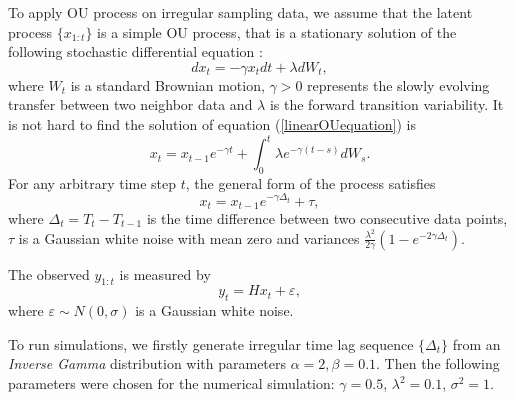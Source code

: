 To apply OU process on irregular sampling data, we assume that the latent process $\{x_{1:t}\}$ is a simple OU process, that is a stationary solution of the following stochastic differential equation : 
\begin{equation}\label{linearOUequation}
dx_t= -\gamma x_tdt+\lambda dW_t, 
\end{equation}
where $W_t$ is a standard Brownian motion, $\gamma>0$ represents the slowly evolving transfer between two neighbor data and $\lambda$ is the forward transition variability. It is not hard to find the solution of equation (\ref{linearOUequation}) is 
\begin{equation*}
x_t = x_{t-1}e^{-\gamma t} +\int_{0}^{t} \lambda e^{-\gamma (t-s)}dW_s. 
\end{equation*}
For any arbitrary time step $t$, the general form of the process satisfies 
\begin{equation}
x_t = x_{t-1}e^{-\gamma \Delta_t} + \tau,
\end{equation}
where $\Delta_t = T_t-T_{t-1}$ is the time difference between two consecutive data points, $\tau$ is a Gaussian white noise with mean zero and variances $\frac{\lambda^2}{2\gamma}\left(1-e^{-2\gamma\Delta_t}\right)$. 

The observed $y_{1:t}$ is measured by 
\begin{equation}
y_t = Hx_t + \varepsilon,
\end{equation}
where $\varepsilon\sim N(0,\sigma)$ is a Gaussian white noise. 

To run simulations, we firstly generate irregular time lag sequence $\{\Delta_t\}$ from an \textit{Inverse Gamma} distribution with parameters $\alpha=2, \beta=0.1$. Then the following parameters were chosen for the numerical simulation: $\gamma = 0.5$, $\lambda^2 = 0.1$, $\sigma^2=1$. 



